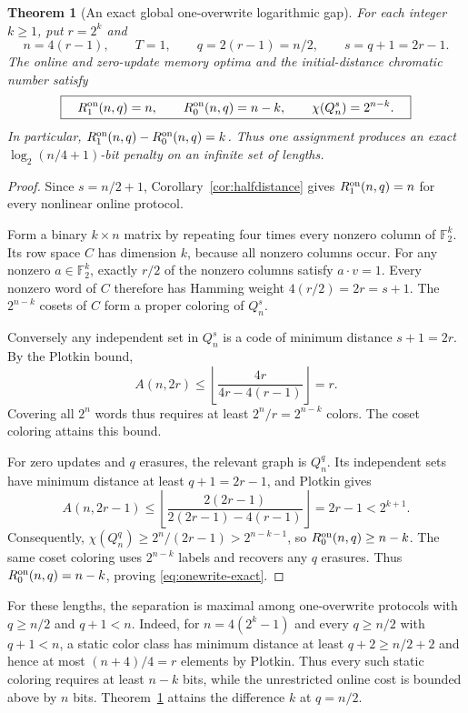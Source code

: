\documentclass[11pt,a4paper]{article}
\newtheorem{theorem}{Theorem}[section]
\newcommand{\F}{\mathbb F_2}
\begin{document}
\begin{theorem}[An exact global one-overwrite logarithmic gap]\label{thm:onewritegap}
For each integer $k\ge1$, put $r=2^k$ and
\[
 n=4(r-1),\qquad T=1,\qquad q=2(r-1)=n/2,\qquad s=q+1=2r-1.
\]
The online and zero-update memory optima and the initial-distance chromatic number satisfy
\begin{equation}\label{eq:onewrite-exact}
 \boxed{\quad
 R_1^{\rm on}(n,q)=n,\qquad
 R_0^{\rm on}(n,q)=n-k,\qquad
 \chi(Q_n^{s})=2^{n-k}.\quad}
\end{equation}
In particular, $R_1^{\rm on}(n,q)-R_0^{\rm on}(n,q)=k$.
Thus one assignment produces an exact $\log_2(n/4+1)$-bit penalty on an infinite set of lengths.
\end{theorem}
\begin{proof}
Since $s=n/2+1$, Corollary~\ref{cor:halfdistance} gives $R_1^{\rm on}(n,q)=n$ for every nonlinear online protocol.

Form a binary $k\times n$ matrix by repeating four times every nonzero column of $\F^k$. Its row space $C$ has dimension $k$, because all nonzero columns occur. For any nonzero $a\in\F^k$, exactly $r/2$ of the nonzero columns satisfy $a\cdot v=1$. Every nonzero word of $C$ therefore has Hamming weight $4(r/2)=2r=s+1$. The $2^{n-k}$ cosets of $C$ form a proper coloring of $Q_n^s$.

Conversely any independent set in $Q_n^s$ is a code of minimum distance $s+1=2r$. By the Plotkin bound,
\[
 A(n,2r)\le\left\lfloor\frac{4r}{4r-4(r-1)}\right\rfloor=r.
\]
Covering all $2^n$ words thus requires at least $2^n/r=2^{n-k}$ colors. The coset coloring attains this bound.

For zero updates and $q$ erasures, the relevant graph is $Q_n^q$. Its independent sets have minimum distance at least $q+1=2r-1$, and Plotkin gives
\[
 A(n,2r-1)\le\left\lfloor\frac{2(2r-1)}{2(2r-1)-4(r-1)}\right\rfloor=2r-1<2^{k+1}.
\]
Consequently, $\chi(Q_n^q)\ge2^n/(2r-1)>2^{n-k-1}$, so $R_0^{\rm on}(n,q)\ge n-k$. The same coset coloring uses $2^{n-k}$ labels and recovers any $q$ erasures. Thus $R_0^{\rm on}(n,q)=n-k$, proving \eqref{eq:onewrite-exact}.
\end{proof}

For these lengths, the separation is maximal among one-overwrite protocols with $q\ge n/2$ and $q+1<n$. Indeed, for $n=4(2^k-1)$ and every $q\ge n/2$ with $q+1<n$, a static color class has minimum distance at least $q+2\ge n/2+2$ and hence at most $(n+4)/4=r$ elements by Plotkin. Thus every such static coloring requires at least $n-k$ bits, while the unrestricted online cost is bounded above by $n$ bits. Theorem~\ref{thm:onewritegap} attains the difference $k$ at $q=n/2$.
\end{document}
